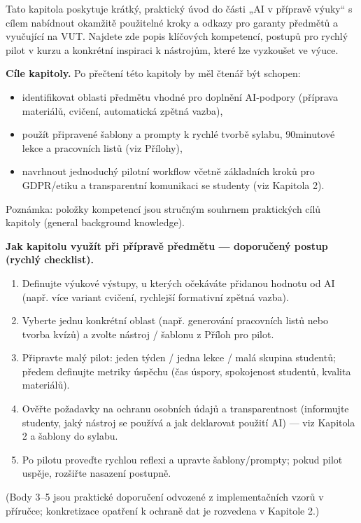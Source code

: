Tato kapitola poskytuje krátký, praktický úvod do části „AI v přípravě výuky“ s cílem nabídnout okamžitě použitelné kroky a odkazy pro garanty předmětů a vyučující na VUT. Najdete zde popis klíčových kompetencí, postupů pro rychlý pilot v kurzu a konkrétní inspiraci k nástrojům, které lze vyzkoušet ve výuce.

\medskip

\textbf{Cíle kapitoly.} Po přečtení této kapitoly by měl čtenář být schopen:
\begin{itemize}
  \item identifikovat oblasti předmětu vhodné pro doplnění AI‑podpory (příprava materiálů, cvičení, automatická zpětná vazba),
  \item použít připravené šablony a prompty k rychlé tvorbě sylabu, 90minutové lekce a pracovních listů (viz Přílohy),
  \item navrhnout jednoduchý pilotní workflow včetně základních kroků pro GDPR/etiku a transparentní komunikaci se studenty (viz Kapitola 2).
\end{itemize}
Poznámka: položky kompetencí jsou stručným souhrnem praktických cílů kapitoly (general background knowledge).

\medskip

\textbf{Jak kapitolu využít při přípravě předmětu — doporučený postup (rychlý checklist).}
\begin{enumerate}
  \item Definujte výukové výstupy, u kterých očekáváte přidanou hodnotu od AI (např. více variant cvičení, rychlejší formativní zpětná vazba).
  \item Vyberte jednu konkrétní oblast (např. generování pracovních listů nebo tvorba kvízů) a zvolte nástroj / šablonu z Příloh pro pilot.
  \item Připravte malý pilot: jeden týden / jedna lekce / malá skupina studentů; předem definujte metriky úspěchu (čas úspory, spokojenost studentů, kvalita materiálů).
  \item Ověřte požadavky na ochranu osobních údajů a transparentnost (informujte studenty, jaký nástroj se používá a jak deklarovat použití AI) — viz Kapitola 2 a šablony do sylabu.
  \item Po pilotu proveďte rychlou reflexi a upravte šablony/prompty; pokud pilot uspěje, rozšiřte nasazení postupně.
\end{enumerate}
(Body 3–5 jsou praktické doporučení odvozené z implementačních vzorů v příručce; konkretizace opatření k ochraně dat je rozvedena v Kapitole 2.)

